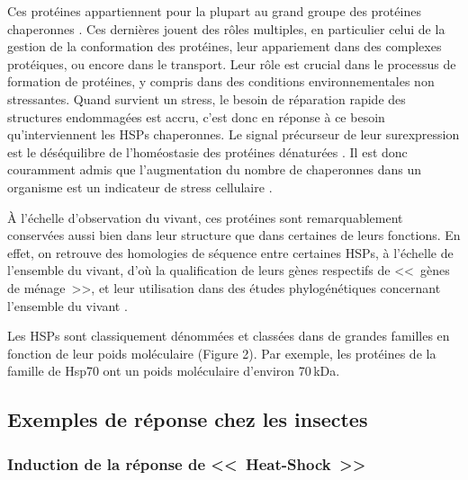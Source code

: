 	Ces protéines appartiennent pour la plupart au grand groupe des protéines chaperonnes \cite{federhoffmann1999}.
	Ces dernières jouent des rôles multiples, en particulier celui de la gestion de la conformation des protéines, leur appariement dans des complexes protéiques, ou encore dans le transport.
	Leur rôle est crucial dans le processus de formation de protéines, y compris dans des conditions environnementales non stressantes.
	Quand survient un stress, le besoin de réparation rapide des structures endommagées est accru, c'est donc en réponse à ce besoin qu'interviennent les HSPs chaperonnes.
	Le signal précurseur de leur surexpression est le déséquilibre de l'homéostasie des protéines dénaturées \cite{ananthan1986}.
	Il est donc couramment admis que l'augmentation du nombre de chaperonnes dans un organisme est un indicateur de stress cellulaire \cite{ryan1996}.

	À l'échelle d'observation du vivant, ces protéines sont remarquablement conservées aussi bien dans leur structure que dans certaines de leurs fonctions.
	En effet, on retrouve des homologies de séquence entre certaines HSPs, à l'échelle de l'ensemble du vivant, d'où la qualification de leurs gènes respectifs de <<~gènes de ménage~>>, et leur utilisation dans des études phylogénétiques concernant l'ensemble du vivant \cite{gupta1995}.

	Les HSPs sont classiquement dénommées et classées dans de grandes familles en fonction de leur poids moléculaire (Figure 2).
	Par exemple, les protéines de la famille de Hsp70 ont un poids moléculaire d'environ 70\,kDa.


	\subsection{Exemples de réponse chez les insectes}

		\subsubsection{Induction de la réponse de <<~Heat-Shock~>>}
